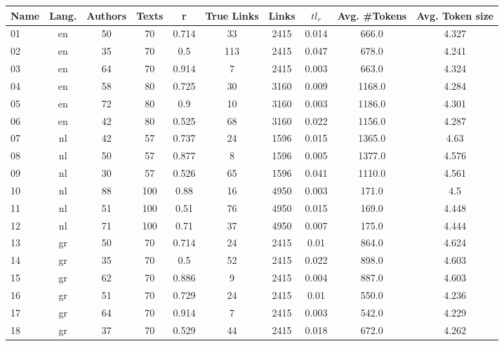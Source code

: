 \begin{table*}[H]
  \begin{tabular}{l c c c c c c c c c}
    \toprule
    \textbf{Name} &
    \textbf{Lang.} &
    \textbf{Authors} &
    \textbf{Texts} &
    \textbf{r} &
    \textbf{True Links} &
    \textbf{Links} &
    \textbf{$tl_r$} &
    \textbf{Avg. \#Tokens} &
    \textbf{Avg. Token size} \\
    \midrule
      01 & en & 50 & 70 & 0.714 & 33 & 2415 & 0.014 & 666.0 & 4.327 \\
      02 & en & 35 & 70 & 0.5 & 113 & 2415 & 0.047 & 678.0 & 4.241 \\
      03 & en & 64 & 70 & 0.914 & 7 & 2415 & 0.003 & 663.0 & 4.324 \\
      04 & en & 58 & 80 & 0.725 & 30 & 3160 & 0.009 & 1168.0 & 4.284 \\
      05 & en & 72 & 80 & 0.9 & 10 & 3160 & 0.003 & 1186.0 & 4.301 \\
      06 & en & 42 & 80 & 0.525 & 68 & 3160 & 0.022 & 1156.0 & 4.287 \\
      07 & nl & 42 & 57 & 0.737 & 24 & 1596 & 0.015 & 1365.0 & 4.63 \\
      08 & nl & 50 & 57 & 0.877 & 8 & 1596 & 0.005 & 1377.0 & 4.576 \\
      09 & nl & 30 & 57 & 0.526 & 65 & 1596 & 0.041 & 1110.0 & 4.561 \\
      10 & nl & 88 & 100 & 0.88 & 16 & 4950 & 0.003 & 171.0 & 4.5 \\
      11 & nl & 51 & 100 & 0.51 & 76 & 4950 & 0.015 & 169.0 & 4.448 \\
      12 & nl & 71 & 100 & 0.71 & 37 & 4950 & 0.007 & 175.0 & 4.444 \\
      13 & gr & 50 & 70 & 0.714 & 24 & 2415 & 0.01 & 864.0 & 4.624 \\
      14 & gr & 35 & 70 & 0.5 & 52 & 2415 & 0.022 & 898.0 & 4.603 \\
      15 & gr & 62 & 70 & 0.886 & 9 & 2415 & 0.004 & 887.0 & 4.603 \\
      16 & gr & 51 & 70 & 0.729 & 24 & 2415 & 0.01 & 550.0 & 4.236 \\
      17 & gr & 64 & 70 & 0.914 & 7 & 2415 & 0.003 & 542.0 & 4.229 \\
      18 & gr & 37 & 70 & 0.529 & 44 & 2415 & 0.018 & 672.0 & 4.262 \\
    \bottomrule
  \end{tabular}
\end{table*}

